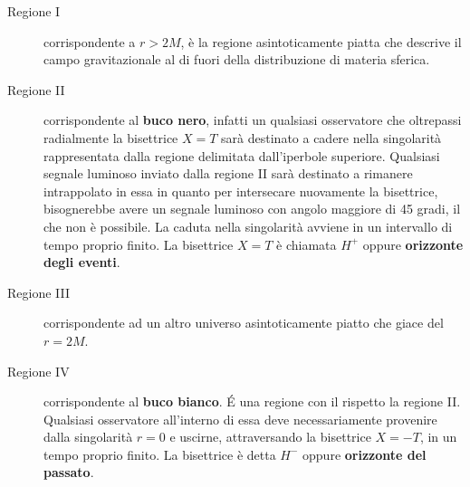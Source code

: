 \begin{description}
    \item[Regione I] corrispondente a $r> 2M$, è la regione asintoticamente piatta che descrive il campo gravitazionale al di fuori della distribuzione di materia sferica.
    \item[Regione II] corrispondente al \textbf{buco nero}, infatti un qualsiasi osservatore che oltrepassi radialmente la bisettrice $X=T$ sarà destinato a cadere nella singolarità rappresentata dalla regione delimitata dall'iperbole superiore. Qualsiasi segnale luminoso inviato dalla regione II sarà destinato a rimanere intrappolato in essa in quanto per intersecare nuovamente la bisettrice, bisognerebbe avere un segnale luminoso con angolo maggiore di 45 gradi, il che non è possibile. La caduta nella singolarità avviene in un intervallo di tempo proprio finito. La bisettrice $X=T$ è chiamata $H^+$ oppure \textbf{orizzonte degli eventi}.
    \item[Regione III] corrispondente ad un altro universo asintoticamente piatto che giace  del  $r=2M$.
    \item[Regione IV] corrispondente al \textbf{buco bianco}. \'E una regione con il  rispetto la regione II. Qualsiasi osservatore all'interno di essa deve necessariamente provenire dalla singolarità $r=0$ e uscirne, attraversando la bisettrice $X=-T$, in un tempo proprio finito. La bisettrice è detta $H^-$ oppure \textbf{orizzonte del passato}.
\end{description}

